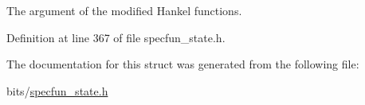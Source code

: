 The argument of the modified Hankel functions. 



Definition at line 367 of file specfun\+\_\+state.\+h.



The documentation for this struct was generated from the following file\+:\begin{DoxyCompactItemize}
\item 
bits/\hyperlink{specfun__state_8h}{specfun\+\_\+state.\+h}\end{DoxyCompactItemize}
